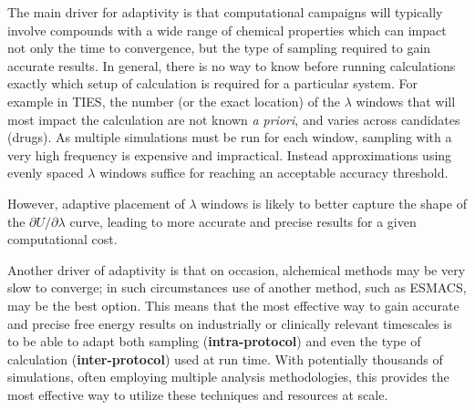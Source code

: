 The main driver for adaptivity is that computational campaigns will
typically involve compounds with a wide range of chemical properties which can
impact not only the time to convergence, but the type of sampling required to
gain accurate results. In general, there is no way to know before running
calculations exactly which setup of calculation is required for a particular
system. For example in TIES, the number (or the exact location) of the
$\lambda$ windows that will most impact the calculation are not known
\textit{a priori}, and varies across candidates (drugs). As multiple simulations 
must be run for each window, sampling with a very high frequency is expensive and 
impractical. Instead approximations using evenly spaced $\lambda$ windows
suffice for reaching an acceptable accuracy threshold. 


However, adaptive placement of $\lambda$
windows is likely to better capture the shape of the 
$\partial U/\partial\lambda$ curve, leading to more accurate and precise 
results for a given computational cost.

Another driver of adaptivity is that on occasion, alchemical methods may be very 
slow to converge; in such circumstances use of another method, such as ESMACS,
may be the best option. This means that the most effective way to gain accurate 
and precise free energy results on industrially or clinically relevant 
timescales is to be able to adapt both sampling (\textbf{intra-protocol}) and 
even the type of calculation (\textbf{inter-protocol}) used at run time. With 
potentially thousands of simulations, often employing multiple analysis 
methodologies, this provides the most effective way to utilize these techniques 
and resources at scale.


